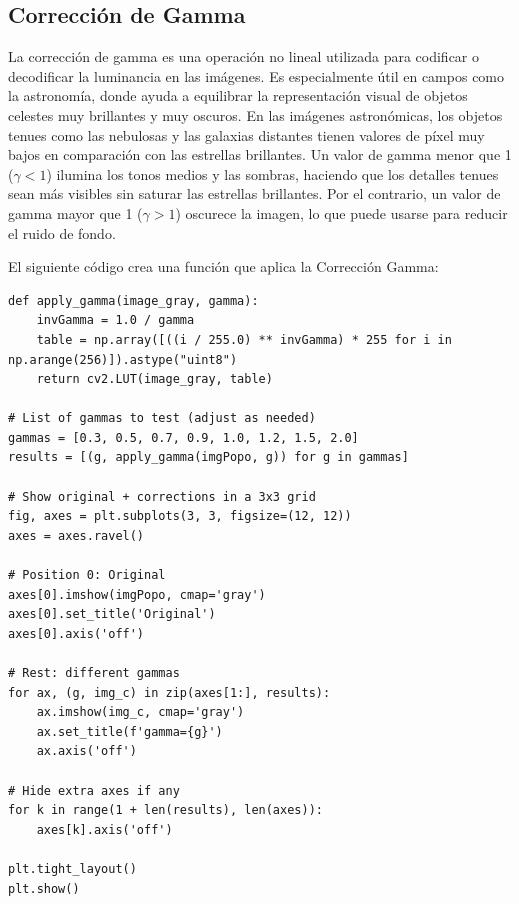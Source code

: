 \documentclass[12pt,letterpaper]{article}
\begin{document}
\subsection{Corrección de Gamma}

La corrección de gamma es una operación no lineal utilizada para codificar o decodificar la luminancia en las imágenes. Es especialmente útil en campos como la astronomía, donde ayuda a equilibrar la representación visual de objetos celestes muy brillantes y muy oscuros.
En las imágenes astronómicas, los objetos tenues como las nebulosas y las galaxias distantes tienen valores de píxel muy bajos en comparación con las estrellas brillantes. Un valor de gamma menor que 1 ($\gamma < 1$) ilumina los tonos medios y las sombras, haciendo que los detalles tenues sean más visibles sin saturar las estrellas brillantes. Por el contrario, un valor de gamma mayor que 1 ($\gamma > 1$) oscurece la imagen, lo que puede usarse para reducir el ruido de fondo.

El siguiente código crea una función que aplica la Corrección Gamma:

\begin{verbatim}
def apply_gamma(image_gray, gamma):
    invGamma = 1.0 / gamma
    table = np.array([((i / 255.0) ** invGamma) * 255 for i in np.arange(256)]).astype("uint8")
    return cv2.LUT(image_gray, table)

# List of gammas to test (adjust as needed)
gammas = [0.3, 0.5, 0.7, 0.9, 1.0, 1.2, 1.5, 2.0]
results = [(g, apply_gamma(imgPopo, g)) for g in gammas]

# Show original + corrections in a 3x3 grid
fig, axes = plt.subplots(3, 3, figsize=(12, 12))
axes = axes.ravel()

# Position 0: Original
axes[0].imshow(imgPopo, cmap='gray')
axes[0].set_title('Original')
axes[0].axis('off')

# Rest: different gammas
for ax, (g, img_c) in zip(axes[1:], results):
    ax.imshow(img_c, cmap='gray')
    ax.set_title(f'gamma={g}')
    ax.axis('off')

# Hide extra axes if any
for k in range(1 + len(results), len(axes)):
    axes[k].axis('off')

plt.tight_layout()
plt.show()
\end{verbatim}
\end{document}
